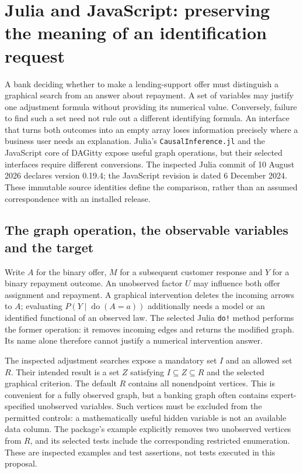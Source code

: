 \section{Julia and JavaScript: preserving the meaning of an identification request}
\label{exec19:otherid-scope}

A bank deciding whether to make a lending-support offer must distinguish a
graphical search from an answer about repayment. A set of variables may justify
one adjustment formula without providing its numerical value. Conversely,
failure to find such a set need not rule out a different identifying formula.
An interface that turns both outcomes into an empty array loses information
precisely where a business user needs an explanation. Julia's
\texttt{CausalInference.jl} and the JavaScript core of DAGitty expose useful
graph operations, but their selected interfaces require different conversions.
The inspected Julia commit of 10 August 2026 declares version 0.19.4; the
JavaScript revision is dated 6 December 2024. These immutable source identities
define the comparison, rather than an assumed correspondence with an installed
release.\citep{exec19_otherid_julia,exec19_otherid_dagitty}

\subsection{The graph operation, the observable variables and the target}
\label{exec19:otherid-graph}
Write $A$ for the binary offer, $M$ for a subsequent customer response and $Y$
for a binary repayment outcome. An unobserved factor $U$ may influence both
offer assignment and repayment. A graphical intervention deletes the incoming
arrows to $A$; evaluating $P(Y\mid\operatorname{do}(A=a))$ additionally needs
a model or an identified functional of an observed law. The selected Julia
\texttt{do!} method performs the former operation: it removes incoming edges
and returns the modified graph. Its name alone therefore cannot justify a
numerical intervention answer.\citep{exec19_otherid_julia}

The inspected adjustment searches expose a mandatory set $I$ and an allowed
set $R$. Their intended result is a set $Z$ satisfying $I\subseteq Z\subseteq R$
and the selected graphical criterion. The default $R$ contains all nonendpoint
vertices. This is convenient for a fully observed graph, but a banking graph
often contains expert-specified unobserved variables. Such vertices must be
excluded from the permitted controls: a mathematically useful hidden variable
is not an available data column. The package's example explicitly removes two
unobserved vertices from $R$, and its selected tests include the corresponding
restricted enumeration. These are inspected examples and test assertions, not
tests executed in this proposal.\citep{exec19_otherid_julia}

